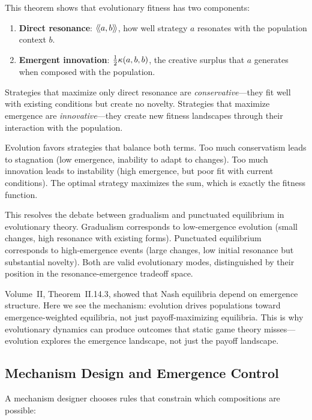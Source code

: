 \begin{interpretation}
This theorem shows that evolutionary fitness has two components:
\begin{enumerate}
  \item \textbf{Direct resonance}: $\langle\!\langle a, b \rangle\!\rangle$, how well strategy $a$ resonates
    with the population context $b$.
  \item \textbf{Emergent innovation}: $\frac{1}{2}\kappa(a, b, b)$, the creative
    surplus that $a$ generates when composed with the population.
\end{enumerate}

Strategies that maximize only direct resonance are \emph{conservative}---they
fit well with existing conditions but create no novelty. Strategies that maximize
emergence are \emph{innovative}---they create new fitness landscapes through
their interaction with the population.

Evolution favors strategies that balance both terms. Too much conservatism leads
to stagnation (low emergence, inability to adapt to changes). Too much innovation
leads to instability (high emergence, but poor fit with current conditions). The
optimal strategy maximizes the sum, which is exactly the fitness function.

This resolves the debate between gradualism and punctuated equilibrium in
evolutionary theory. Gradualism corresponds to low-emergence evolution (small
changes, high resonance with existing forms). Punctuated equilibrium corresponds
to high-emergence events (large changes, low initial resonance but substantial
novelty). Both are valid evolutionary modes, distinguished by their position in
the resonance-emergence tradeoff space.

Volume~II, Theorem~II.14.3, showed that Nash equilibria depend on emergence
structure. Here we see the mechanism: evolution drives populations toward
emergence-weighted equilibria, not just payoff-maximizing equilibria. This is
why evolutionary dynamics can produce outcomes that static game theory misses---evolution
explores the emergence landscape, not just the payoff landscape.
\end{interpretation}

\subsection{Mechanism Design and Emergence Control}

A mechanism designer chooses rules that constrain which compositions are possible:

